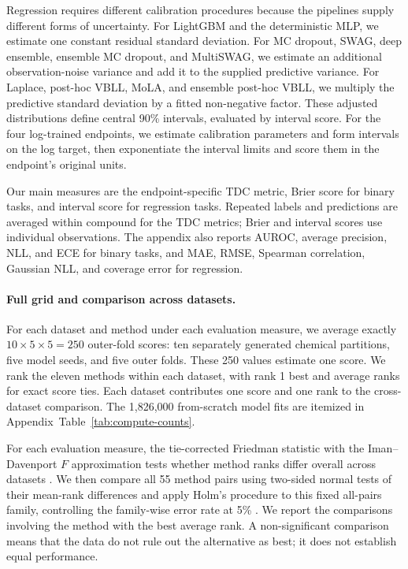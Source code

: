 Regression requires different calibration procedures because the pipelines supply different forms
of uncertainty. For LightGBM and the deterministic MLP, we estimate one constant residual standard
deviation. For MC dropout, SWAG, deep ensemble, ensemble MC dropout, and MultiSWAG, we estimate an
additional observation-noise variance and add it to the supplied predictive variance. For Laplace,
post-hoc VBLL, MoLA, and ensemble post-hoc VBLL, we multiply the predictive standard deviation by a
fitted non-negative factor. These adjusted distributions define central 90\% intervals, evaluated
by interval score. For the four log-trained endpoints, we estimate calibration parameters and form
intervals on the log target, then exponentiate the interval limits and score them in the endpoint's
original units.

Our main measures are the endpoint-specific TDC metric, Brier score for binary tasks, and interval
score for regression tasks. Repeated labels and predictions are averaged within compound for the
TDC metrics; Brier and interval scores use individual observations. The appendix also reports
AUROC, average precision, NLL, and ECE for binary tasks, and MAE, RMSE, Spearman correlation,
Gaussian NLL, and coverage error for regression.

\paragraph{Full grid and comparison across datasets.}
For each dataset and method under each evaluation measure, we average exactly
$10\times5\times5=250$ outer-fold scores: ten separately generated chemical partitions, five model seeds,
and five outer folds. These 250 values estimate one score. We rank the eleven methods within each
dataset, with rank 1 best and average ranks for exact score ties. Each dataset contributes one score
and one rank to the cross-dataset comparison. The 1,826,000 from-scratch model fits are itemized in
Appendix~Table~\ref{tab:compute-counts}.

For each evaluation measure, the tie-corrected Friedman statistic with the Iman--Davenport $F$
approximation tests whether method ranks differ overall across datasets \citep{demsar2006statistical}.
We then compare all 55 method pairs using two-sided normal tests of their mean-rank differences and
apply Holm's procedure to this fixed all-pairs family, controlling the family-wise error rate at 5\%
\citep{garcia2008extension}. We report the comparisons involving the method with the best average
rank. A non-significant comparison means that the data do not rule out the alternative as best; it
does not establish equal performance.

